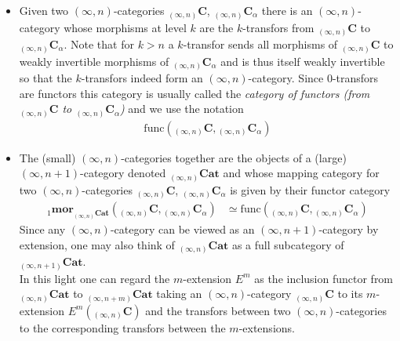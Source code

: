 \begin{itemize}
\item
Given two $(\infty,n)$-categories ${_{(\infty,n)}}\mathbf{C}$, ${_{(\infty,n)}}\mathbf{C}_{\alpha}$ there is an $(\infty,n)$-category whose morphisms at level $k$ are the $k$-transfors {\glqq}from ${_{(\infty,n)}}\mathbf{C}$ to ${_{(\infty,n)}}\mathbf{C}_{\alpha}${\grqq}. Note that for $k > n$ a $k$-transfor sends all morphisms of ${_{(\infty,n)}}\mathbf{C}$ to weakly invertible morphisms of ${_{(\infty,n)}}\mathbf{C}_{\alpha}$ and is thus itself weakly invertible so that the $k$-transfors indeed form an $(\infty,n)$-category. Since $0$-transfors are functors this category is usually called the \textit{category of functors (from ${_{(\infty,n)}}\mathbf{C}$ to ${_{(\infty,n)}}\mathbf{C}_{\alpha}$)} and we use the notation
\begin{align*}
  \mathrm{func}
  \left(
    {_{(\infty,n)}}\mathbf{C}
    ,
    {_{(\infty,n)}}\mathbf{C}_{\alpha}
  \right)
\end{align*}

\item
The (small) $(\infty,n)$-categories together are the objects of a (large) $(\infty,n+1)$-category denoted ${_{(\infty,n)}}\mathbf{Cat}$ and whose mapping category for two $(\infty,n)$-categories ${_{(\infty,n)}}\mathbf{C}$, ${_{(\infty,n)}}\mathbf{C}_{\alpha}$ is given by their functor category
\begin{align*}
  {_{1}}\mathbf{mor}_{{_{(\infty,n)}}\mathbf{Cat}}
  \left(
    {_{(\infty,n)}}\mathbf{C}
    ,
    {_{(\infty,n)}}\mathbf{C}_{\alpha}
  \right)
  &\simeq
  \mathrm{func}
  \left(
    {_{(\infty,n)}}\mathbf{C}
    ,
    {_{(\infty,n)}}\mathbf{C}_{\alpha}
  \right)
\end{align*}
Since any $(\infty,n)$-category can be viewed as an $(\infty,n+1)$-category by extension, one may also think of ${_{(\infty,n)}}\mathbf{Cat}$ as a full subcategory of ${_{(\infty,n+1)}}\mathbf{Cat}$.
\\
In this light one can regard the $m$-extension $E^{m}$ as the inclusion functor from ${_{(\infty,n)}}\mathbf{Cat}$ to ${_{(\infty,n+m)}}\mathbf{Cat}$ taking an $(\infty,n)$-category ${_{(\infty,n)}}\mathbf{C}$ to its $m$-extension $E^{m}({_{(\infty,n)}}\mathbf{C})$ and the transfors between two $(\infty,n)$-categories to the corresponding transfors between the $m$-extensions.


\end{itemize}

